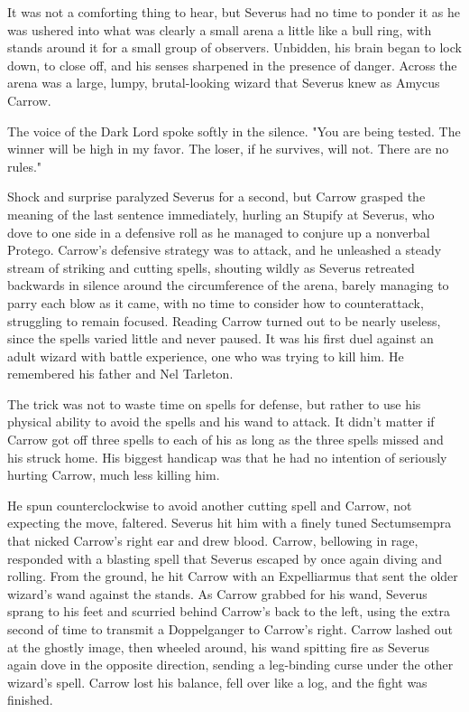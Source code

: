 It was not a comforting thing to hear, but Severus had no time to ponder it as he was ushered into what was clearly a small arena a little like a bull ring, with stands around it for a small group of observers. Unbidden, his brain began to lock down, to close off, and his senses sharpened in the presence of danger. Across the arena was a large, lumpy, brutal-looking wizard that Severus knew as Amycus Carrow.

The voice of the Dark Lord spoke softly in the silence. "You are being tested. The winner will be high in my favor. The loser, if he survives, will not. There are no rules."

Shock and surprise paralyzed Severus for a second, but Carrow grasped the meaning of the last sentence immediately, hurling an Stupify at Severus, who dove to one side in a defensive roll as he managed to conjure up a nonverbal Protego. Carrow's defensive strategy was to attack, and he unleashed a steady stream of striking and cutting spells, shouting wildly as Severus retreated backwards in silence around the circumference of the arena, barely managing to parry each blow as it came, with no time to consider how to counterattack, struggling to remain focused. Reading Carrow turned out to be nearly useless, since the spells varied little and never paused. It was his first duel against an adult wizard with battle experience, one who was trying to kill him. He remembered his father and Nel Tarleton.

The trick was not to waste time on spells for defense, but rather to use his physical ability to avoid the spells and his wand to attack. It didn't matter if Carrow got off three spells to each of his as long as the three spells missed and his struck home. His biggest handicap was that he had no intention of seriously hurting Carrow, much less killing him.

He spun counterclockwise to avoid another cutting spell and Carrow, not expecting the move, faltered. Severus hit him with a finely tuned Sectumsempra that nicked Carrow's right ear and drew blood. Carrow, bellowing in rage, responded with a blasting spell that Severus escaped by once again diving and rolling. From the ground, he hit Carrow with an Expelliarmus that sent the older wizard's wand against the stands. As Carrow grabbed for his wand, Severus sprang to his feet and scurried behind Carrow's back to the left, using the extra second of time to transmit a Doppelganger to Carrow's right. Carrow lashed out at the ghostly image, then wheeled around, his wand spitting fire as Severus again dove in the opposite direction, sending a leg-binding curse under the other wizard's spell. Carrow lost his balance, fell over like a log, and the fight was finished.

